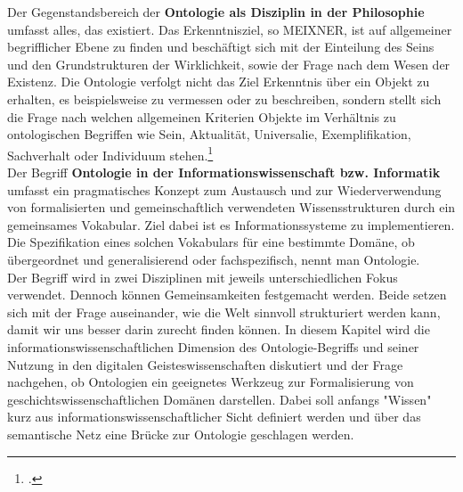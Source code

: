 \documentclass[12pt,a4paper]{article}
\begin{document}
Der Gegenstandsbereich der \textbf{Ontologie als Disziplin in der Philosophie} umfasst alles, das existiert. Das Erkenntnisziel, so MEIXNER, ist auf allgemeiner begrifflicher Ebene zu finden und beschäftigt sich mit der Einteilung des Seins und den Grundstrukturen der Wirklichkeit, sowie der Frage nach dem Wesen der Existenz. Die Ontologie verfolgt nicht das Ziel Erkenntnis über ein Objekt zu erhalten, es beispielsweise zu vermessen oder zu beschreiben, sondern stellt sich die Frage nach welchen allgemeinen Kriterien Objekte im Verhältnis zu ontologischen Begriffen wie Sein, Aktualität, Universalie, Exemplifikation, Sachverhalt oder Individuum stehen.\footcite{meixner1994wissenschaft}
\\
Der Begriff \textbf{Ontologie in der Informationswissenschaft bzw. Informatik} umfasst ein pragmatisches Konzept zum Austausch und zur Wiederverwendung von formalisierten und gemeinschaftlich verwendeten Wissensstrukturen durch ein gemeinsames Vokabular. Ziel dabei ist es Informationssysteme zu implementieren. Die Spezifikation eines solchen Vokabulars für eine bestimmte Domäne, ob übergeordnet und generalisierend oder fachspezifisch, nennt man Ontologie.
\\
Der Begriff wird in zwei Disziplinen mit jeweils unterschiedlichen Fokus verwendet. Dennoch können Gemeinsamkeiten festgemacht werden. Beide setzen sich mit der Frage auseinander, wie die Welt sinnvoll strukturiert werden kann, damit wir uns besser darin zurecht finden können. In diesem Kapitel wird die informationswissenschaftlichen Dimension des Ontologie-Begriffs und seiner Nutzung in den digitalen Geisteswissenschaften diskutiert und der Frage nachgehen, ob Ontologien ein geeignetes Werkzeug zur Formalisierung von geschichtswissenschaftlichen Domänen darstellen. Dabei soll anfangs "Wissen" kurz aus informationswissenschaftlicher Sicht definiert werden und über das semantische Netz eine Brücke zur Ontologie geschlagen werden. 

\end{document}
